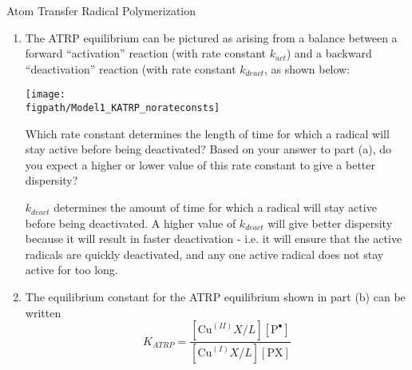 \begin{activity}{Atom Transfer Radical Polymerization}
\begin{exercises}
\begin{enumerate}
				Explain, in 2-3 sentences, how you expect a ``long'' radical lifetime to affect the dispersity of the polymer sample.
		
		\begin{solution}{}
			Active radicals staying active for a ``long'' time will increase the dispersity of the polymer.  Achieving narrow dispersities in living polymerizations requires that chains initiate at the same time, that they grow at the same rate, and that the reaction proceeds in the absence of irreversible termination or chain transfer.  If the radical remains active for a ``long'' time, then a single chain that is activated may add many monomers at once, causing it to grow much faster than the chains that are deactivated.  The requirement that all chains grow at the same rate is thus violated, and the dispersity will increase.
			
			Ideally, for the best dispersity, each chain should add only a single monomer in a given activatation-deactivation step.
		\end{solution}
				
			\item The ATRP equilibrium can be pictured as arising from a balance between a forward ``activation'' reaction (with rate constant $k_{act}$) and a backward ``deactivation'' reaction (with rate constant $k_{deact}$, as shown below:
	
	\centerline{\texttt{[image: \\figpath/Model1\_KATRP\_norateconsts]}}
	
			Which rate constant determines the length of time for which a radical will stay active before being deactivated?  Based on your answer to part (a), do you expect a higher or lower value of this rate constant to give a better dispersity?
		
		\begin{solution}{}
			$k_{deact}$ determines the amount of time for which a radical will stay active before being deactivated.  A higher value of $k_{deact}$ will give better dispersity because it will result in faster deactivation - i.e. it will ensure that the active radicals are quickly deactivated, and any one active radical does not stay active for too long.
		\end{solution}
			
			\item The equilibrium constant for the ATRP equilibrium shown in part (b) can be written
				\begin{equation*}
					K_{ATRP} = \frac{[\text{Cu}^{(II)}X/L][\text{P}^\bullet]}{[\text{Cu}^{(I)}X/L][\text{PX}]}
				\end{equation*}
				

\end{enumerate}
\end{exercises}
\end{activity}
